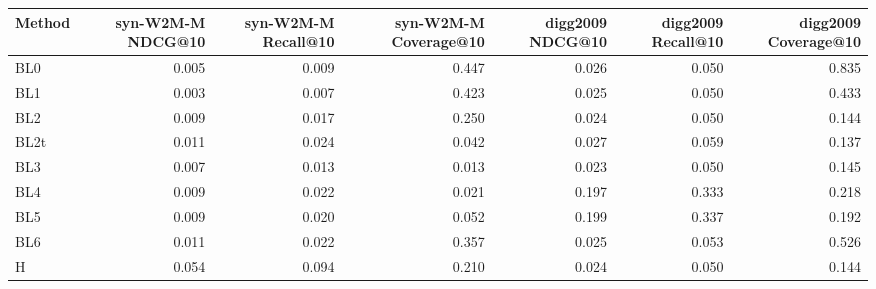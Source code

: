 \begin{tabular}{lrrrrrr}
\toprule
Method & syn-W2M-M NDCG@10 & syn-W2M-M Recall@10 & syn-W2M-M Coverage@10 & digg2009 NDCG@10 & digg2009 Recall@10 & digg2009 Coverage@10 \\
\midrule
BL0 & 0.005 & 0.009 & 0.447 & 0.026 & 0.050 & 0.835 \\
BL1 & 0.003 & 0.007 & 0.423 & 0.025 & 0.050 & 0.433 \\
BL2 & 0.009 & 0.017 & 0.250 & 0.024 & 0.050 & 0.144 \\
BL2t & 0.011 & 0.024 & 0.042 & 0.027 & 0.059 & 0.137 \\
BL3 & 0.007 & 0.013 & 0.013 & 0.023 & 0.050 & 0.145 \\
BL4 & 0.009 & 0.022 & 0.021 & 0.197 & 0.333 & 0.218 \\
BL5 & 0.009 & 0.020 & 0.052 & 0.199 & 0.337 & 0.192 \\
BL6 & 0.011 & 0.022 & 0.357 & 0.025 & 0.053 & 0.526 \\
H & 0.054 & 0.094 & 0.210 & 0.024 & 0.050 & 0.144 \\
\bottomrule
\end{tabular}
